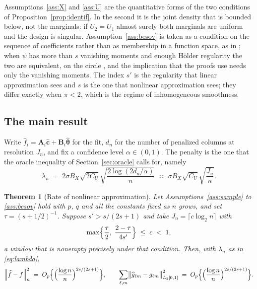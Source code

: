 \documentclass[12pt]{article} %
\newtheorem{theorem}{Theorem}
\theoremstyle{definition}
\newcommand{\normn}[1]{\left\lVert #1 \right\rVert_{n}}
\newcommand{\cv}{\ell}
\newcommand{\md}{m}
\newcommand{\gcomp}[2]{g_{#1#2}}
\newcommand{\btheta}{\boldsymbol{\theta}}
\newcommand{\thetahat}{\widehat{\btheta}}
\newcommand{\chat}{\widehat{\mathbf{c}}}
\newcommand{\penn}{\lambda_{n}}
\newcommand{\seff}{s'}
\newcommand{\Amat}{\mathbf{A}}
\newcommand{\Bmat}{\mathbf{B}}
\begin{document}
Assumptions~\ref{ass:X} and \ref{ass:U} are the quantitative forms of the two
conditions of Proposition~\ref{prop:identif}. In the second it is the joint
density that is bounded below, not the marginals: if $U_2 = U_1$ almost surely
both marginals are uniform and the design is singular.
Assumption~\ref{ass:besov} is taken as a condition on the sequence of
coefficients rather than as membership in a function space, as in
\citet{Klopp-Pensky-2015}; when $\psi$ has more than $s$ vanishing moments and
enough Hölder regularity the two are equivalent, on the circle
\citep[Section 3.6]{Cohen-2003}, and the implication that the proofs use needs
only the vanishing moments. The index $\seff$ is the regularity that \textcolor{colR1}{linear
approximation} sees and $s$ is the one that nonlinear approximation sees; they differ
exactly when $\pi < 2$, which is the regime of inhomogeneous smoothness.

\subsection{The main result}
\label{sec:main}

Write $\widehat{f}_i = \Amat_i\chat + \Bmat_i\thetahat$ for the fit, $d_n$ for
the number of penalized columns at resolution $J_n$, and fix a confidence
level $\alpha \in (0,1)$. The penalty is the one that the oracle inequality of
Section~\ref{sec:oracle} calls for, namely
\begin{equation}
  \label{eq:lambda}
  \penn \;=\; 2\sigma B_X\sqrt{2C_U}\,
  \sqrt{\frac{2\log(2d_n/\alpha)}{n}} \;\asymp\;
  \sigma B_X \sqrt{C_U}\,\sqrt{\frac{J_n}{n}} .
\end{equation}

\begin{theorem}[Rate of nonlinear approximation]
\label{thm:main}
Let Assumptions~\ref{ass:sample} to \ref{ass:besov} hold with $p$, $q$ and all
the constants fixed as $n$ grows, and set $\tau = (s+1/2)^{-1}$. Suppose
$\seff > s/(2s+1)$ and take $J_n = \lceil c \log_2 n\rceil$ with
\begin{equation}
  \label{eq:window}
  \max\Bigl\{\frac{\tau}{2},\; \frac{2-\tau}{4\seff}\Bigr\}
  \;\le\; c \;<\; 1 ,
\end{equation}
a window that is nonempty precisely under that condition. Then, with $\penn$
as in \eqref{eq:lambda},
\[
  \normn{\widehat{f}-f}^{2}
  \;=\; O_p\Bigl\{\Bigl(\frac{\log n}{n}\Bigr)^{2s/(2s+1)}\Bigr\},
  \qquad
  \sum_{\cv,\md}\bigl\lVert \widehat{g}_{\cv\md}-\gcomp{\cv}{\md}
  \bigr\rVert_{L_2[0,1]}^{2}
  \;=\; O_p\Bigl\{\Bigl(\frac{\log n}{n}\Bigr)^{2s/(2s+1)}\Bigr\} .
\]
\end{theorem}
\end{document}
